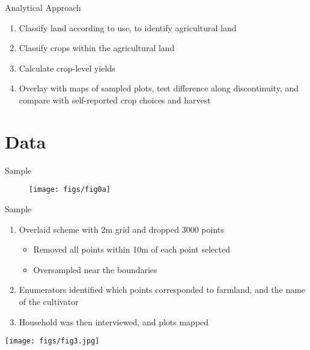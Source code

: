\documentclass{beamer}
\begin{document}
\begin{frame}{Analytical Approach}
	\begin{enumerate}
		\item Classify land according to use, to identify agricultural land
		\item Classify crops within the agricultural land
		\item Calculate crop-level yields
		\item Overlay with maps of sampled plots, test difference along discontinuity, and compare with self-reported crop choices and harvest
	\end{enumerate}
\end{frame}

\section{Data}

\begin{frame}[plain]{Sample}
	\begin{figure}
		\centering
		\texttt{[image: figs/fig0a]}
	\end{figure}
\end{frame}

\begin{frame}{Sample}
	\begin{enumerate}
		\item Overlaid scheme with 2m grid and dropped 3000 points
		\begin{itemize}
			\item Removed all points within 10m of each point selected
			\item Oversampled near the boundaries
		\end{itemize}
		\item Enumerators identified which points corresponded to farmland, and the name of the cultivator
		\item Household was then interviewed, and plots mapped
	\end{enumerate}
\end{frame}

\begin{frame}[noframenumbering]
	\begin{center}
		\texttt{[image: figs/fig3.jpg]}
	\end{center}
\end{frame}
\end{document}
